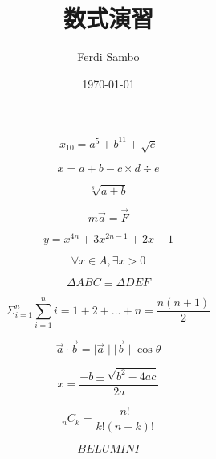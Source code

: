 \documentclass[a4j,twocolumn]{jarticle}
\begin{document}
\title{数式演習}
\author{Ferdi Sambo}
\date{\today}

\maketitle
\thispagestyle{empty}

\begin{equation}
x_{10}=a^5+b^{11}+\sqrt{c} 
\end{equation}

\begin{equation}
x=a + b - c \times d \div e
\end{equation}

\begin{equation}
\sqrt[s]{a+b}
\end{equation}

\begin{equation}
m\vec{a}=\vec{F}
\end{equation}

\begin{equation}
y = x^{4n} + 3x^{2n-1} + 2x - 1
\end{equation}

\begin{equation}
\forall x \in A, \exists x > 0
\end{equation}

\begin{equation}
\Delta ABC \equiv \Delta DEF
\end{equation}

\begin{equation}
\Sigma_{i=1}^n %
\sum_{i=1}^n i = 1 + 2 + \dots + n = \frac{n(n+1)}{2}
\end{equation}

\begin{equation}
\vec{a} \cdot \vec{b} = \mid \vec{a} \mid \mid \vec{b} \mid \cos\theta 
\end{equation}

\begin{equation}
x = \frac{-b \pm \sqrt{b^2 - 4ac}}{2a}
\end{equation}

\begin{equation}
_nC_k = \frac{n!}{k!(n-k)!}
\end{equation}

\begin{equation}
BELUM INI
\end{equation}
\end{document}
